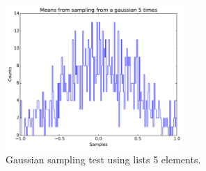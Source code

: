 \documentclass[11pt,letterpaper]{article}
\begin{document}
\begin{figure}
    \centering
    \includegraphics[width=0.6\textwidth]{figures/problem3_1.pdf}
    \caption{Gaussian sampling test using lists 5 elements.}
    \label{prob3_1}
\end{figure}
\end{document}
